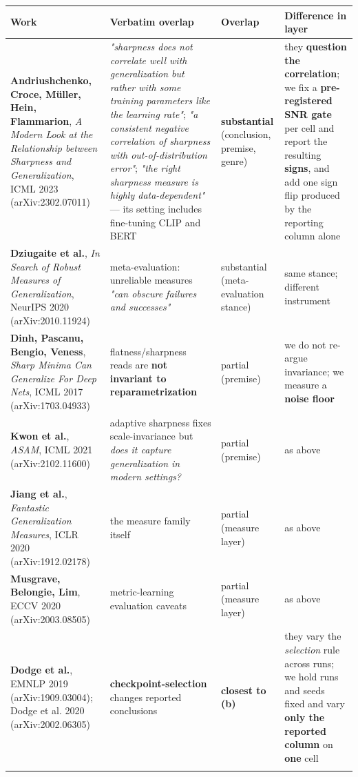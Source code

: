 \documentclass[pdflatex,sn-mathphys-ay]{sn-jnl}
\begin{document}
{\footnotesize
\setlength{\tabcolsep}{4pt}
\begin{longtable}{p{}p{}p{}p{}}
\toprule
Work & Verbatim overlap & Overlap & Difference in layer \\
\midrule
\endhead
\textbf{Andriushchenko, Croce, M\"{u}ller, Hein, Flammarion}, \emph{A Modern Look at the Relationship between Sharpness and Generalization}, ICML 2023 (arXiv:2302.07011) & \emph{"sharpness does not correlate well with generalization but rather with some training parameters like the learning rate"}; \emph{"a consistent negative correlation of sharpness with out-of-distribution error"}; \emph{"the right sharpness measure is highly data-dependent"} --- its setting includes fine-tuning CLIP and BERT & \textbf{substantial} (conclusion, premise, genre) & they \textbf{question the correlation}; we fix a \textbf{pre-registered SNR gate} per cell and report the resulting \textbf{signs}, and add one sign flip produced by the reporting column alone \\
\textbf{Dziugaite et al.}, \emph{In Search of Robust Measures of Generalization}, NeurIPS 2020 (arXiv:2010.11924) & meta-evaluation: unreliable measures \emph{"can obscure failures and successes"} & substantial (meta-evaluation stance) & same stance; different instrument \\
\textbf{Dinh, Pascanu, Bengio, Veness}, \emph{Sharp Minima Can Generalize For Deep Nets}, ICML 2017 (arXiv:1703.04933) & flatness/sharpness reads are \textbf{not invariant to reparametrization} & partial (premise) & we do not re-argue invariance; we measure a \textbf{noise floor} \\
\textbf{Kwon et al.}, \emph{ASAM}, ICML 2021 (arXiv:2102.11600) & adaptive sharpness fixes scale-invariance but \emph{does it capture generalization in modern settings?} & partial (premise) & as above \\
\textbf{Jiang et al.}, \emph{Fantastic Generalization Measures}, ICLR 2020 (arXiv:1912.02178) & the measure family itself & partial (measure layer) & as above \\
\textbf{Musgrave, Belongie, Lim}, ECCV 2020 (arXiv:2003.08505) & metric-learning evaluation caveats & partial (measure layer) & as above \\
\textbf{Dodge et al.}, EMNLP 2019 (arXiv:1909.03004); Dodge et al. 2020 (arXiv:2002.06305) & \textbf{checkpoint-selection} changes reported conclusions & \textbf{closest to (b)} & they vary the \emph{selection} rule across runs; we hold runs and seeds fixed and vary \textbf{only the reported column} on \textbf{one} cell \\
\botrule
\end{longtable}}
\end{document}
